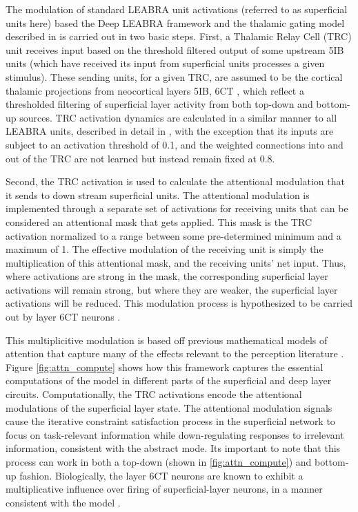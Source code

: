\documentclass[11pt, titlepage, twoside]{article}
\begin{document}
The modulation of standard LEABRA unit activations (referred to as superficial units here) based the Deep LEABRA framework and the thalamic gating model described in \textcite{KetzJensenOReilly15} is carried out in two basic steps.  First, a Thalamic Relay Cell (TRC) unit receives input based on the threshold filtered output of some upstream 5IB units (which have received its input from superficial units  processes a given stimulus).  These sending units, for a given TRC, are assumed to be the cortical thalamic projections from neocortical layers 5IB, 6CT \cite{ShermanGuillery06}, which reflect a thresholded filtering of superficial layer activity from both top-down and bottom-up sources. TRC activation dynamics are calculated in a similar manner to all LEABRA units, described in detail in \cite{KetzMorkondaOReilly13}, with the exception that its inputs are subject to an activation threshold of 0.1, and the weighted connections into and out of the TRC are not learned but instead remain fixed at 0.8.  

Second, the TRC activation is used to calculate the attentional modulation that it sends to down stream superficial units.  The attentional modulation is implemented through a separate set of activations for receiving units that can be considered an attentional mask that gets applied.  This mask is the TRC activation normalized to a range between some pre-determined minimum and a maximum of 1.  The effective modulation of the receiving unit is simply the multiplication of this attentional mask, and the receiving units' net input.  Thus, where activations are strong in the mask, the corresponding superficial layer activations will remain strong, but where they are weaker, the superficial layer activations will be reduced.  This modulation process is hypothesized to be carried out by layer 6CT neurons  \cite{BortoneOlsenScanziani14,OlsenBortoneAdesnikEtAl12}.

This multiplicitive modulation is based off previous mathematical models of attention that capture many of the effects relevant to the perception literature \cite{ReynoldsHeeger09,MontijnKlinkVanWezel12}.  Figure \ref{fig:attn_compute} shows how this framework captures the essential computations of the \textcite{ReynoldsHeeger09} model in different parts of the superficial and deep layer circuits.  Computationally, the TRC activations encode the attentional modulations of the superficial layer state. The attentional modulation signals cause the iterative constraint satisfaction process in the superficial network to focus on task-relevant information while down-regulating responses to irrelevant information, consistent with the abstract \textcite{ReynoldsHeeger09} mode.  Its important to note that this process can work in both a top-down (shown in \ref{fig:attn_compute}) and bottom-up fashion. Biologically, the layer 6CT neurons are known to exhibit a multiplicative influence over firing of superficial-layer neurons, in a manner consistent with the \textcite{ReynoldsHeeger09} model \cite{BortoneOlsenScanziani14,OlsenBortoneAdesnikEtAl12}. 
\end{document}
